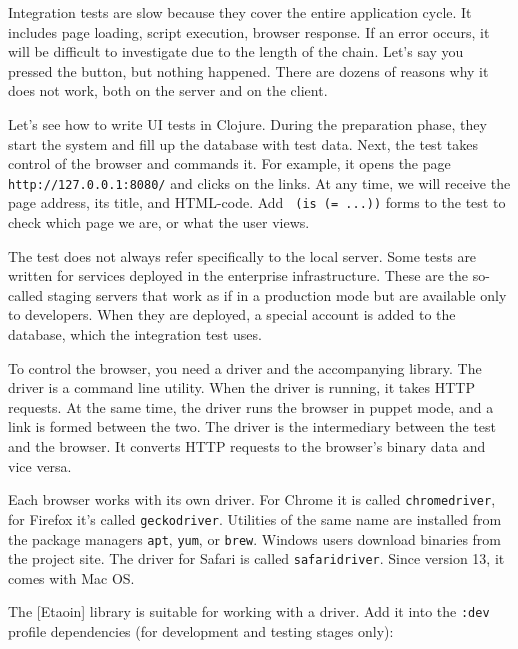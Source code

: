 Integration tests are slow because they cover the entire application cycle. It includes page loading, script execution, browser response. If an error occurs, it will be difficult to investigate due to the length of the chain. Let's say you pressed the button, but
nothing happened. There are dozens of reasons why it does not work, both on the server and on the client.

Let's see how to write UI tests in Clojure. During the preparation phase, they start the system and fill up the database with test data. Next, the test takes control of the browser and commands it. For example, it opens the page \verb|http://127.0.0.1:8080/| and clicks on the links. At any time, we will receive the page address, its title, and HTML-code. Add \verb| (is (= ...))| forms to the test to check which page we are, or what the user views.

The test does not always refer specifically to the local server. Some tests are written for services deployed in the enterprise infrastructure. These are the so-called staging servers that work as if in a production mode but are available only to developers. When they are deployed, a special account is added to the database, which the integration test uses.

To control the browser, you need a driver and the accompanying library. The driver is a command line utility. When the driver is running, it takes HTTP requests. At the same time, the driver runs the browser in puppet mode, and a link is formed between the two. The driver is the intermediary between the test and the browser. It converts HTTP requests to the browser's binary data and vice versa.


Each browser works with its own driver. For Chrome it is called \verb|chromedriver|, for Firefox it's called \verb|geckodriver|. Utilities of the same name are installed from the package managers \verb|apt|, \verb|yum|, or \verb|brew|. Windows users download binaries from the project site. The driver for Safari is called \verb|safaridriver|. Since version 13, it comes with Mac OS.


The [Etaoin] library is suitable for working with a driver. Add it into the \verb|:dev| profile dependencies (for development and testing stages only):

